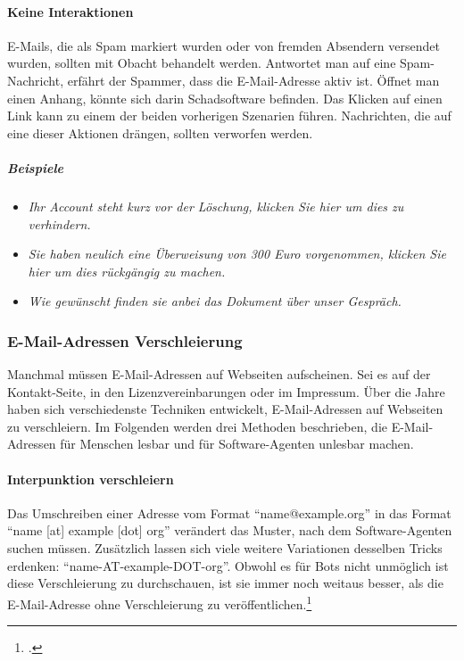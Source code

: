 \paragraph{Keine Interaktionen}
\label{par:keine-interaktionen}

E-Mails, die als Spam markiert wurden oder von fremden Absendern versendet
wurden, sollten mit Obacht behandelt werden. Antwortet man auf eine
Spam-Nachricht, erfährt der Spammer, dass die E-Mail-Adresse aktiv ist. Öffnet
man einen Anhang, könnte sich darin Schadsoftware befinden. Das Klicken auf
einen Link kann zu einem der beiden vorherigen Szenarien führen. Nachrichten,
die auf eine dieser Aktionen drängen, sollten verworfen werden.

\subparagraph{Beispiele}
\label{spar:beispiele}

\begin{itemize}
\item
  \emph{Ihr Account steht kurz vor der Löschung, klicken Sie hier um dies zu
  verhindern.}
\item
  \emph{Sie haben neulich eine Überweisung von 300 Euro vorgenommen, klicken
  Sie hier um dies rückgängig zu machen.}
\item
  \emph{Wie gewünscht finden sie anbei das Dokument über unser Gespräch.}
\end{itemize}

\subsubsection{E-Mail-Adressen Verschleierung}
\label{ssub:e-mail-adressen-verschleierung}

Manchmal müssen E-Mail-Adressen auf Webseiten aufscheinen. Sei es auf der
Kontakt-Seite, in den Lizenzvereinbarungen oder im Impressum. Über die Jahre
haben sich verschiedenste Techniken entwickelt, E-Mail-Adressen auf Webseiten
zu verschleiern. Im Folgenden werden drei Methoden beschrieben, die
E-Mail-Adressen für Menschen lesbar und für Software-Agenten unlesbar machen.

\paragraph{Interpunktion verschleiern}
\label{par:interpunktion-verschleiern}

Das Umschreiben einer Adresse vom Format \enquote{name@example.org} in das
Format \enquote{name {[}at{]} example {[}dot{]} org} verändert das Muster, nach
dem Software-Agenten suchen müssen. Zusätzlich lassen sich viele weitere
Variationen desselben Tricks erdenken: \enquote{name-AT-example-DOT-org}.
Obwohl es für Bots nicht unmöglich ist diese Verschleierung zu durchschauen,
ist sie immer noch weitaus besser, als die E-Mail-Adresse ohne Verschleierung
zu veröffentlichen.\footcite{obfuscateEmailAddresses}

